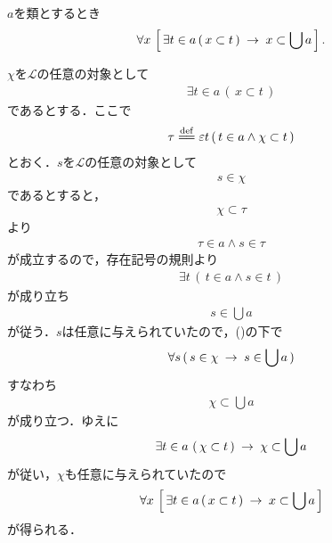 	\begin{screen}
		\begin{thm}[要素の部分集合は合併の部分集合]
		\label{thm:union_is_bigger_than_any_member}
			$a$を類とするとき
			\begin{align}
				\forall x\, \left[\, \exists t \in a\, (\, x \subset t\, ) \hspace{0.25em}\rightarrow\hspace{0.25em} x \subset \bigcup a\, \right].
			\end{align}
		\end{thm}
	\end{screen}
	
	\begin{sketch}
		$\chi$を$\mathcal{L}$の任意の対象として
		\begin{align}
			\exists t \in a\, (\, x \subset t\, )
			\label{fom:thm_union_is_bigger_than_any_member_1}
		\end{align}
		であるとする．ここで
		\begin{align}
			\tau \defeq \varepsilon t\, (\, t \in a \wedge \chi \subset t\, )
		\end{align}
		とおく．$s$を$\mathcal{L}$の任意の対象として
		\begin{align}
			s \in \chi
		\end{align}
		であるとすると，
		\begin{align}
			\chi \subset \tau
		\end{align}
		より
		\begin{align}
			\tau \in a \wedge s \in \tau
		\end{align}
		が成立するので，存在記号の規則より
		\begin{align}
			\exists t\, \left(\, t \in a \wedge s \in t\, \right)
		\end{align}
		が成り立ち
		\begin{align}
			s \in \bigcup a
		\end{align}
		が従う．$s$は任意に与えられていたので，()の下で
		\begin{align}
			\forall s\, (\, s \in \chi \hspace{0.25em}\rightarrow\hspace{0.25em} s \in \bigcup a\, )
		\end{align}
		すなわち
		\begin{align}
			\chi \subset \bigcup a
		\end{align}
		が成り立つ．ゆえに
		\begin{align}
			\exists t \in a\, \left(\, \chi \subset t\, \right) \hspace{0.25em}\rightarrow\hspace{0.25em} \chi \subset \bigcup a
		\end{align}
		が従い，$\chi$も任意に与えられていたので
		\begin{align}
			\forall x\, \left[\, \exists t \in a\, (\, x \subset t\, ) \hspace{0.25em}\rightarrow\hspace{0.25em} x \subset \bigcup a\, \right]
		\end{align}
		が得られる．
		\QED
	\end{sketch}
	
